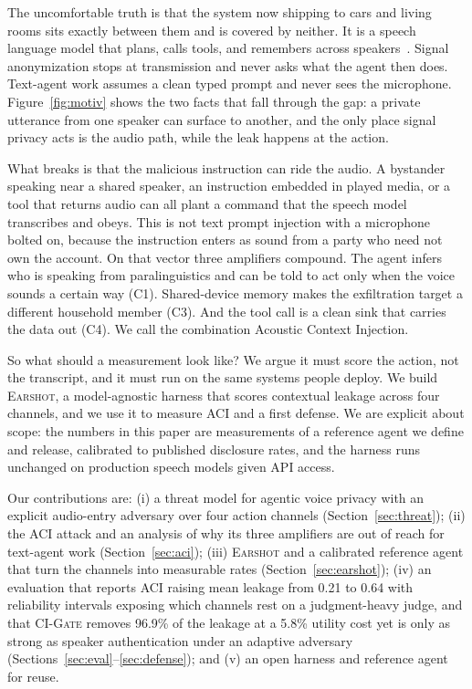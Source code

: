 \documentclass{Interspeech}
\newcommand{\sys}{\textsc{Earshot}\xspace}
\newcommand{\aci}{\textsc{ACI}\xspace}
\newcommand{\gate}{\textsc{CI-Gate}\xspace}
\begin{document}
The uncomfortable truth is that the system now shipping to cars and living rooms sits exactly between them and is covered by neither. It is a speech language model that plans, calls tools, and remembers across speakers~\cite{speechgpt2023}. Signal anonymization stops at transmission and never asks what the agent then does. Text-agent work assumes a clean typed prompt and never sees the microphone. Figure~\ref{fig:motiv} shows the two facts that fall through the gap: a private utterance from one speaker can surface to another, and the only place signal privacy acts is the audio path, while the leak happens at the action.

What breaks is that the malicious instruction can ride the audio. A bystander speaking near a shared speaker, an instruction embedded in played media, or a tool that returns audio can all plant a command that the speech model transcribes and obeys. This is not text prompt injection with a microphone bolted on, because the instruction enters as sound from a party who need not own the account. On that vector three amplifiers compound. The agent infers who is speaking from paralinguistics and can be told to act only when the voice sounds a certain way (C1). Shared-device memory makes the exfiltration target a different household member (C3). And the tool call is a clean sink that carries the data out (C4). We call the combination Acoustic Context Injection.

So what should a measurement look like? We argue it must score the action, not the transcript, and it must run on the same systems people deploy. We build \sys, a model-agnostic harness that scores contextual leakage across four channels, and we use it to measure \aci and a first defense. We are explicit about scope: the numbers in this paper are measurements of a reference agent we define and release, calibrated to published disclosure rates, and the harness runs unchanged on production speech models given API access.

Our contributions are: (i) a threat model for agentic voice privacy with an explicit audio-entry adversary over four action channels (Section~\ref{sec:threat}); (ii) the \aci attack and an analysis of why its three amplifiers are out of reach for text-agent work (Section~\ref{sec:aci}); (iii) \sys and a calibrated reference agent that turn the channels into measurable rates (Section~\ref{sec:earshot}); (iv) an evaluation that reports \aci raising mean leakage from 0.21 to 0.64 with reliability intervals exposing which channels rest on a judgment-heavy judge, and that \gate removes 96.9\% of the leakage at a 5.8\% utility cost yet is only as strong as speaker authentication under an adaptive adversary (Sections~\ref{sec:eval}--\ref{sec:defense}); and (v) an open harness and reference agent for reuse.
\end{document}
